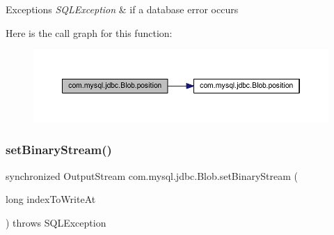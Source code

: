\begin{DoxyExceptions}{Exceptions}
{\em S\+Q\+L\+Exception} & if a database error occurs \\
\hline
\end{DoxyExceptions}
Here is the call graph for this function\+:\nopagebreak
\begin{figure}[H]
\begin{center}
\leavevmode
\includegraphics[width=350pt]{classcom_1_1mysql_1_1jdbc_1_1_blob_a7ea2c2c3ebb85581cd54c5615e725a88_cgraph}
\end{center}
\end{figure}
\mbox{\label{classcom_1_1mysql_1_1jdbc_1_1_blob_afa722f94370d179ecd4275e8717751a2}} 
\subsubsection{\texorpdfstring{set\+Binary\+Stream()}{setBinaryStream()}}
{\footnotesize\ttfamily synchronized Output\+Stream com.\+mysql.\+jdbc.\+Blob.\+set\+Binary\+Stream (\begin{DoxyParamCaption}\item[{long}]{index\+To\+Write\+At }\end{DoxyParamCaption}) throws S\+Q\+L\+Exception}

